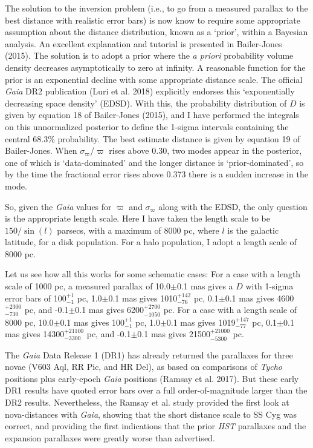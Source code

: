 \documentclass[a4paper,fleqn,usenatbib]{mnras}
\begin{document}
The solution to the inversion problem (i.e., to go from a measured parallax to the best distance with realistic error bars) is now know to require some appropriate assumption about the distance distribution, known as a `prior', within a Bayesian analysis.  An excellent explanation and tutorial is presented in Bailer-Jones (2015).  The solution is to adopt a prior where the {\it a priori} probability volume density decreases asymptotically to zero at infinity.  A reasonable function for the prior is an exponential decline with some appropriate distance scale.  The official {\it Gaia} DR2 publication (Luri et al. 2018) explicitly endorses this `exponentially decreasing space density' (EDSD).  With this, the probability distribution of $D$ is given by equation 18 of Bailer-Jones (2015), and I have performed the integrals on this unnormalized posterior to define the 1-sigma intervals containing the central 68.3\% probability.  The best estimate distance is given by equation 19 of Bailer-Jones.  When $\sigma_{\varpi}$/$\varpi$ rises above 0.30, two modes appear in the posterior, one of which is `data-dominated' and the longer distance is `prior-dominated', so by the time the fractional error rises above 0.373 there is a sudden increase in the mode.

So, given the {\it Gaia} values for $\varpi$ and $\sigma_{\varpi}$ along with the EDSD, the only question is the appropriate length scale.  Here I have taken the length scale to be $150/\sin({l})$ parsecs, with a maximum of 8000 pc, where ${l}$ is the galactic latitude, for a disk population.  For a halo population, I adopt a length scale of 8000 pc.  

Let us see how all this works for some schematic cases:  For a case with a length scale of 1000 pc, a measured parallax of 10.0$\pm$0.1 mas gives a $D$ with 1-sigma error bars of 100$^{+1}_{-1}$ pc, 1.0$\pm$0.1 mas gives 1010$^{+142}_{-76}$ pc, 0.1$\pm$0.1 mas gives 4600$^{+2300}_{-730}$ pc, and -0.1$\pm$0.1 mas gives 6200$^{+2700}_{-1050}$ pc.  For a case with a length scale of 8000 pc, 10.0$\pm$0.1 mas gives 100$^{+1}_{-1}$ pc, 1.0$\pm$0.1 mas gives 1019$^{+147}_{-77}$ pc, 0.1$\pm$0.1 mas gives 14300$^{+21100}_{-3300}$ pc, and -0.1$\pm$0.1 mas gives 21500$^{+21000}_{-5300}$ pc.

The {\it Gaia} Data Release 1 (DR1) has already returned the parallaxes for three novae (V603 Aql, RR Pic, and HR Del), as based on comparisons of {\it Tycho} positions plus early-epoch {\it Gaia} positions (Ramsay et al. 2017).  But these early DR1 results have quoted error bars over a full order-of-magnitude larger than the DR2 results.  Nevertheless, the Ramsay et al. study provided the first look at nova-distances with {\it Gaia}, showing that the short distance scale to SS Cyg was correct, and providing the first indications that the prior {\it HST} parallaxes and the expansion parallaxes were greatly worse than advertised.
\end{document}
